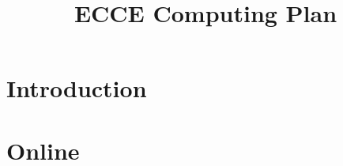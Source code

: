 \documentclass[12pt,twoside]{article}
\title{ECCE Computing Plan}
\begin{document}
\pagestyle{empty}


\cleardoublepage
\pagestyle{plain}
\maketitle
{}








\begin{abstract}
\label{sec:ExecutiveSummary}

\end{abstract}
\clearpage
\setcounter{tocdepth}{3}
\tableofcontents
\clearpage
{}
\setcounter{page}{1}

\section {Introduction}
\label{sec:introduction}




%

\section {Online}
\label{sec:online}

\end{document}
